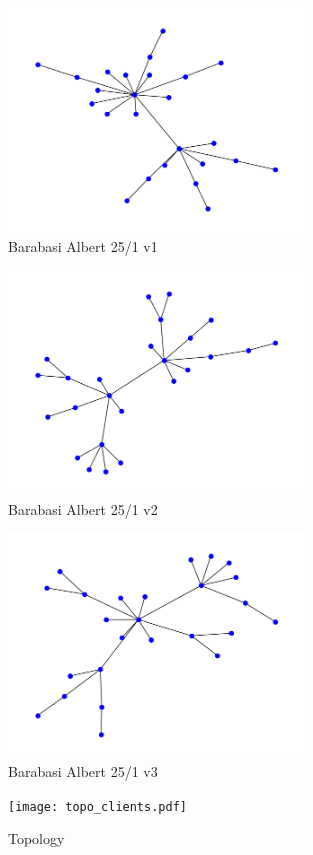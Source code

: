 \begin{figure}
    \begin{center}
        \includegraphics[width=0.7\textwidth]{Bilder/net_topo_ba_25_1.png}
    \end{center}
    \caption{Barabasi Albert 25/1 v1}
    \label{fig:ba_25_1_1}
\end{figure}
\begin{figure}
    \begin{center}
        \includegraphics[width=0.7\textwidth]{Bilder/net_topo_ba_25_1_1.png}
    \end{center}
    \caption{Barabasi Albert 25/1 v2}
    \label{fig:ba_25_1_2}
\end{figure}
\begin{figure}
    \begin{center}
        \includegraphics[width=0.7\textwidth]{Bilder/net_topo_ba_25_1_2.png}
    \end{center}
    \caption{Barabasi Albert 25/1 v3}
    \label{fig:ba_25_1_3}
\end{figure}
\begin{figure}
    \begin{center}
        \texttt{[image: topo\_clients.pdf]}
    \end{center}
    \caption{Topology}
    \label{fig:topology}
\end{figure}



